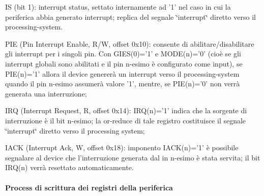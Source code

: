 \begin{DoxyItemize}
\begin{DoxyItemize}
\item I\+S (bit 1)\+: interrupt status, settato internamente ad '1' nel caso in cui la periferica abbia generato interrupt; replica del segnale \char`\"{}interrupt\char`\"{} diretto verso il processing-\/system.
\end{DoxyItemize}
\item P\+I\+E (Pin Interrupt Enable, R/\+W, offset 0x10)\+: consente di abilitare/disabilitare gli interrupt per i singoli pin. Con G\+I\+E\+S(0)='1' e M\+O\+D\+E(n)='0' (cioè se gli interrupt globali sono abilitati e il pin n-\/esimo è configurato come input), se P\+I\+E(n)='1' allora il device genererà un interrupt verso il processing-\/system quando il pin n-\/esimo assumerà valore '1', mentre, se P\+I\+E(n)='0' non verrà generata una interruzione;
\item I\+R\+Q (Interrupt Request, R, offset 0x14)\+: I\+R\+Q(n)='1' indica che la sorgente di interruzione è il bit n-\/esimo; la or-\/reduce di tale registro costituisce il segnale \char`\"{}interrupt\char`\"{} diretto verso il processing system;
\item I\+A\+C\+K (Interrupt Ack, W, offset 0x18)\+: imponento I\+A\+C\+K(n)='1' è possibile segnalare al device che l'interruzione generata dal in n-\/esimo è stata servita; il bit I\+R\+Q(n) verrà resettato automaticamente.
\end{DoxyItemize}

\paragraph*{Process di scrittura dei registri della periferica}

